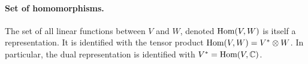 	\paragraph{Set of homomorphisms.} The set of all linear functions between $V$ and $W$, denoted $\text{Hom}(V,W)$ is itself a representation. It is identified with the tensor product $\text{Hom}(V,W) = V^* \otimes W$. In particular, the dual representation is identified with $V^* = \text{Hom}(V,\mathbb{C})$.
	
	
	
	